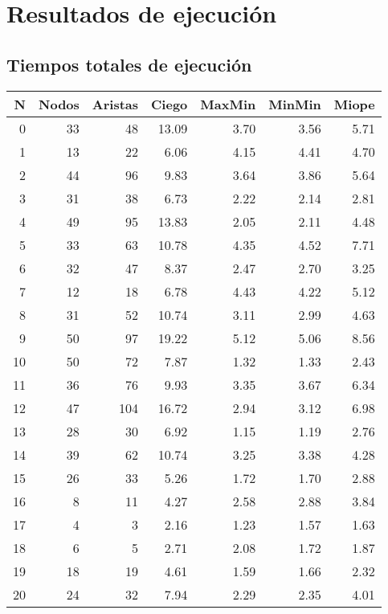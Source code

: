 \chapter{Resultados de ejecución}

\section{Tiempos totales de ejecución}


\begin{longtable}{rrrrrrr}
  \hline
N & Nodos & Aristas & Ciego & MaxMin & MinMin & Miope \\ 
  \hline
  0 &  33 &  48 & 13.09 & 3.70 & 3.56 & 5.71 \\ 
    1 &  13 &  22 & 6.06 & 4.15 & 4.41 & 4.70 \\ 
    2 &  44 &  96 & 9.83 & 3.64 & 3.86 & 5.64 \\ 
    3 &  31 &  38 & 6.73 & 2.22 & 2.14 & 2.81 \\ 
    4 &  49 &  95 & 13.83 & 2.05 & 2.11 & 4.48 \\ 
    5 &  33 &  63 & 10.78 & 4.35 & 4.52 & 7.71 \\ 
    6 &  32 &  47 & 8.37 & 2.47 & 2.70 & 3.25 \\ 
    7 &  12 &  18 & 6.78 & 4.43 & 4.22 & 5.12 \\ 
    8 &  31 &  52 & 10.74 & 3.11 & 2.99 & 4.63 \\ 
    9 &  50 &  97 & 19.22 & 5.12 & 5.06 & 8.56 \\ 
   10 &  50 &  72 & 7.87 & 1.32 & 1.33 & 2.43 \\ 
   11 &  36 &  76 & 9.93 & 3.35 & 3.67 & 6.34 \\ 
   12 &  47 & 104 & 16.72 & 2.94 & 3.12 & 6.98 \\ 
   13 &  28 &  30 & 6.92 & 1.15 & 1.19 & 2.76 \\ 
   14 &  39 &  62 & 10.74 & 3.25 & 3.38 & 4.28 \\ 
   15 &  26 &  33 & 5.26 & 1.72 & 1.70 & 2.88 \\ 
   16 &   8 &  11 & 4.27 & 2.58 & 2.88 & 3.84 \\ 
   17 &   4 &   3 & 2.16 & 1.23 & 1.57 & 1.63 \\ 
   18 &   6 &   5 & 2.71 & 2.08 & 1.72 & 1.87 \\ 
   19 &  18 &  19 & 4.61 & 1.59 & 1.66 & 2.32 \\ 
   20 &  24 &  32 & 7.94 & 2.29 & 2.35 & 4.01 \\ 

\end{longtable}
